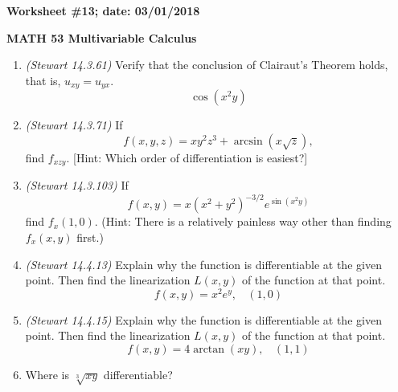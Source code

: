 \documentclass{article}
\begin{document}
{\bf Worksheet \#13; date: 03/01/2018}

{\bf MATH 53 Multivariable Calculus}

\begin{enumerate}
\item {\em (Stewart 14.3.61)} Verify that the conclusion of Clairaut's Theorem holds, that is, $u_{xy} = u_{yx}$.
\[
\cos(x^2 y)
\]

\item {\em (Stewart 14.3.71)} If
\[
f(x, y, z) = x y^2 z^3 + \arcsin(x \sqrt{z}),
\]
find $f_{xzy}$. [Hint: Which order of differentiation is easiest?]

\item {\em (Stewart 14.3.103)} If
\[
f(x, y) = x (x^2 + y^2)^{-3/2} e^{\sin (x^2 y)}
\]
find $f_x(1, 0)$. (Hint: There is a relatively painless way other than finding $f_x(x, y)$ first.)

\item {\em (Stewart 14.4.13)} Explain why the function is differentiable at the given point. Then find the linearization $L(x, y)$ of the function at that point.
\[
f(x, y) = x^2 e^y, ~~~~ (1, 0)
\]

\item {\em (Stewart 14.4.15)} Explain why the function is differentiable at the given point. Then find the linearization $L(x, y)$ of the function at that point.
\[
f(x, y) = 4 \arctan (xy), ~~~~ (1, 1)
\]

\item Where is $\sqrt[3]{xy}$ differentiable?
\end{enumerate}
\end{document}
